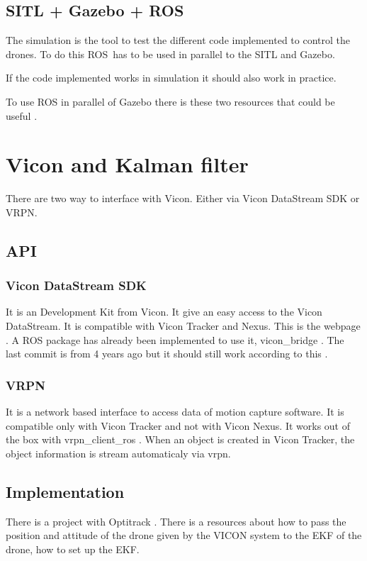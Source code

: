 \subsection{SITL + Gazebo + ROS}
The simulation is the tool to test the different code implemented to control the drones.
To do this ROS has to be used in parallel to the SITL and Gazebo.

If the code implemented works in simulation it should also work in practice.

To use ROS in parallel of Gazebo there is these two resources that could be useful \cite{youtube_gazebo_ros} \cite{github_gazebo_ros}.



\section{Vicon and Kalman filter}
There are two way to interface with Vicon. Either via Vicon DataStream SDK or VRPN.

\subsection{API}
\subsubsection{Vicon DataStream SDK}
It is an Development Kit from Vicon. It give an easy access to the Vicon DataStream. It is compatible with Vicon Tracker and Nexus. This is the webpage \cite{vicon_sdk}. A ROS package has already been implemented to use it, vicon\_bridge \cite{github_vicon_bridge}.
The last commit is from 4 years ago but it should still work according to this \cite{ros_packages_for_vicon}.

\subsubsection{VRPN}
It is a network based interface to access data of motion capture software. It is compatible only with Vicon Tracker and not with Vicon Nexus. It works out of the box with vrpn\_client\_ros \cite{ros_vrpn_client_ros}. When an object is created in Vicon Tracker, the object information is stream automaticaly via vrpn.

\subsection{Implementation}
There is a project with Optitrack \cite{ardupilot_optitrack}. There is a resources about how to pass the position and attitude of the drone given by the VICON system to the EKF of the drone, how to set up the EKF.

